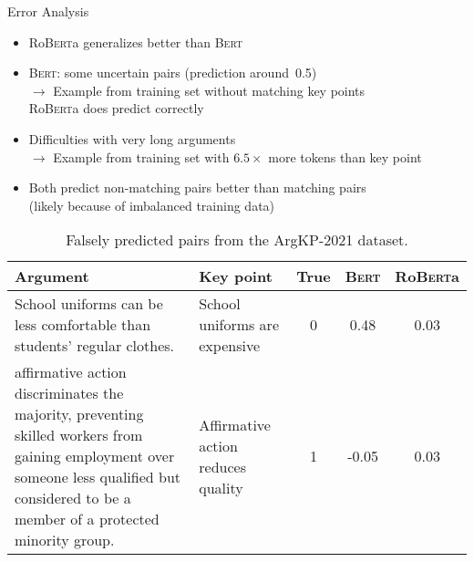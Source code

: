 \documentclass[english,handout]{mlutalk}
\newcommand{\ArgKP}{\mbox{ArgKP-2021}\xspace}
\newcommand{\Bert}{\textsc{Bert}\xspace}
\newcommand{\Roberta}{\mbox{Ro\textsc{Bert}a}\xspace}
\begin{document}
\begin{frame}{Error Analysis}
  \begin{itemize}
    \item \Roberta generalizes better than \Bert
    \item \Bert: some uncertain pairs (prediction around~0.5) \\ \(\to\) Example from training set without matching key points \\ \phantom{\(\to\)} \Roberta does predict correctly
    \item Difficulties with very long arguments \\ \(\to\) Example from training set with \(6.5\times\) more tokens than key point
    \item Both predict non-matching pairs better than matching pairs \\ (likely because of imbalanced training data)
  \end{itemize}
  \begin{table}
    \smaller\smaller\renewcommand{\arraystretch}{1.35}
    \caption{Falsely predicted pairs from the \ArgKP dataset.}
    \begin{tabularx}{\linewidth}{Xp{2.15cm}ccc}
      \toprule
      \textbf{Argument} & \textbf{Key point} & \textbf{True} & \textbf{\Bert} & \textbf{\Roberta} \\
      \midrule
      School uniforms can be less comfortable than students' regular clothes. & %
      School uniforms are expensive & %
      0 & \phantom{-}0.48 & 0.03 \\
      affirmative action discriminates the majority, preventing skilled workers from gaining employment over someone less qualified but considered to be a member of a protected minority group. & %
      Affirmative action reduces quality & %
      1 & -0.05 & 0.03 \\
      \bottomrule
    \end{tabularx}
  \end{table}
  

\end{frame}
\end{document}
